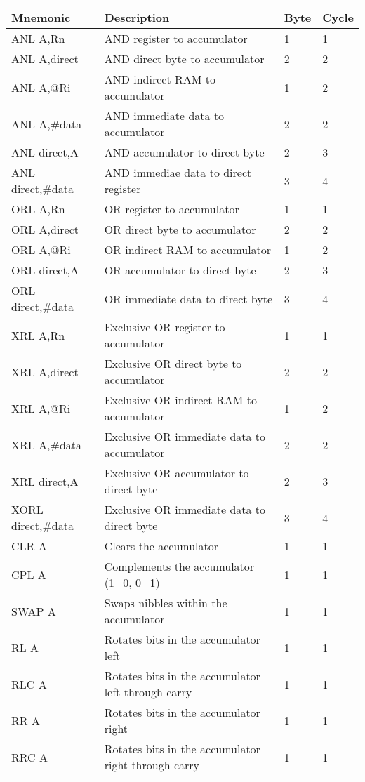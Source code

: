 \documentclass[
]{article}
\begin{document}
\begin{longtable}[]{@{}llll@{}}
\toprule
\textbf{Mnemonic} & \textbf{Description} & \textbf{Byte} &
\textbf{Cycle} \\
\midrule
\endhead
ANL A,Rn & AND register to accumulator & 1 & 1 \\
ANL A,direct & AND direct byte to accumulator & 2 & 2 \\
ANL A,@Ri & AND indirect RAM to accumulator & 1 & 2 \\
ANL A,\#data & AND immediate data to accumulator & 2 & 2 \\
ANL direct,A & AND accumulator to direct byte & 2 & 3 \\
ANL direct,\#data & AND immediae data to direct register & 3 & 4 \\
ORL A,Rn & OR register to accumulator & 1 & 1 \\
ORL A,direct & OR direct byte to accumulator & 2 & 2 \\
ORL A,@Ri & OR indirect RAM to accumulator & 1 & 2 \\
ORL direct,A & OR accumulator to direct byte & 2 & 3 \\
ORL direct,\#data & OR immediate data to direct byte & 3 & 4 \\
XRL A,Rn & Exclusive OR register to accumulator & 1 & 1 \\
XRL A,direct & Exclusive OR direct byte to accumulator & 2 & 2 \\
XRL A,@Ri & Exclusive OR indirect RAM to accumulator & 1 & 2 \\
XRL A,\#data & Exclusive OR immediate data to accumulator & 2 & 2 \\
XRL direct,A & Exclusive OR accumulator to direct byte & 2 & 3 \\
XORL direct,\#data & Exclusive OR immediate data to direct byte & 3 &
4 \\
CLR A & Clears the accumulator & 1 & 1 \\
CPL A & Complements the accumulator (1=0, 0=1) & 1 & 1 \\
SWAP A & Swaps nibbles within the accumulator & 1 & 1 \\
RL A & Rotates bits in the accumulator left & 1 & 1 \\
RLC A & Rotates bits in the accumulator left through carry & 1 & 1 \\
RR A & Rotates bits in the accumulator right & 1 & 1 \\
RRC A & Rotates bits in the accumulator right through carry & 1 & 1 \\
\bottomrule
\end{longtable}
\end{document}
